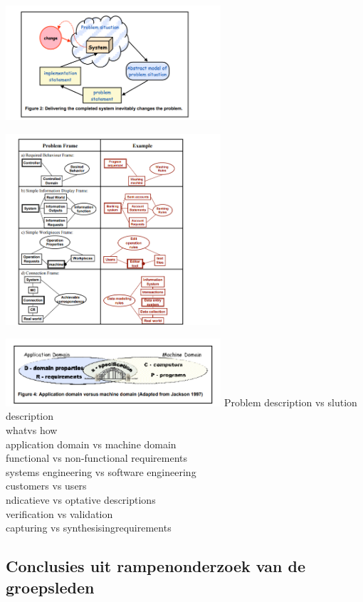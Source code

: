 \documentclass{article}
\begin{document}
			\includegraphics[width=8cm]{oplossing_easterbrook.png}
			
				\includegraphics[width=8cm]{problemframejackson1997easterbrook.png}
				
			
					
						\includegraphics[width=8cm]{whatvshoe_easterbrook.png}
	Problem description vs slution description \\
	whatvs how \\
	application domain vs machine domain \\
	functional vs non-functional requirements \\
	systems engineering vs software engineering \\
	customers vs users \\
	ndicatieve vs optative descriptions \\
	verification vs validation \\
	capturing vs synthesisingrequirements \\
	
	\subsection{Conclusies uit rampenonderzoek van de groepsleden}
	
\end{document}
